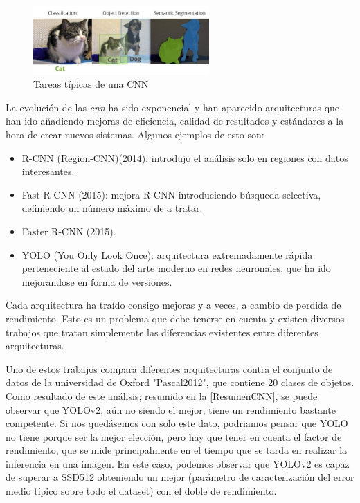 \begin{figure}[H]
    \centering
    \includegraphics[width=0.6\textwidth]{images/4/TiposTareas.png}
    \caption{Tareas típicas de una CNN\cite{kallfelzsirmacekSEQUENTIALIMAGEPROCESSING2019}}
    \label{fig:tareasCNN}
\end{figure}

La evolución de las \textit{\acrshort{cnn}} ha sido exponencial y han aparecido arquitecturas que han ido añadiendo mejoras de eficiencia, calidad de resultados y estándares a la hora de crear nuevos 
sistemas. Algunos ejemplos de esto son:
\begin{itemize}
    \item R-CNN (Region-CNN)(2014): introdujo el análisis solo en regiones con datos interesantes.
    \item Fast R-CNN (2015): mejora R-CNN introduciendo búsqueda selectiva, definiendo un número máximo de  a tratar.
    \item Faster R-CNN (2015).
    \item YOLO (You Only Look Once)\cite{redmonYouOnlyLook2016}: arquitectura extremadamente rápida perteneciente al estado del arte moderno en redes neuronales, que ha ido mejorandose en forma de versiones.
\end{itemize}

Cada arquitectura ha traído consigo mejoras y a veces, a cambio de perdida de rendimiento. Esto es un problema que debe tenerse en cuenta y existen diversos trabajos que tratan simplemente las diferencias 
existentes entre diferentes arquitecturas.

Uno de estos trabajos\cite{hanAdvancedDeepLearningTechniques2018} compara diferentes arquitecturas contra el conjunto de datos de la universidad de Oxford "Pascal2012"\cite{PASCALVisualObject}, que contiene 20 clases de objetos.\newline
Como resultado de este análisis; resumido en la \autoref{ResumenCNN}, se puede observar que YOLOv2, aún no siendo el mejor, tiene un rendimiento bastante competente. Si nos quedásemos con solo este dato, podriamos pensar que YOLO 
no tiene porque ser la mejor elección, pero hay que tener en cuenta el factor de rendimiento, que se mide principalmente en el tiempo que se tarda en realizar la inferencia en una imagen. En este caso, podemos observar 
que YOLOv2 es capaz de superar a SSD512 obteniendo un mejor (parámetro de caracterización del error medio típico sobre todo el dataset) con el doble de rendimiento.

